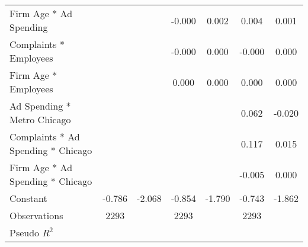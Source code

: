 {\begin{tabular}{l*{6}{c}}
Firm Age * Ad Spending&                  &                  &   -0.000         &    0.002\sym{***}&    0.004\sym{**} &    0.001         \\
Complaints * Employees&                  &                  &   -0.000         &    0.000         &   -0.000         &    0.000         \\
Firm Age * Employees&                  &                  &    0.000         &    0.000         &    0.000         &    0.000         \\
Ad Spending * Metro Chicago&                  &                  &                  &                  &    0.062\sym{*}  &   -0.020         \\
Complaints * Ad Spending * Chicago&                  &                  &                  &                  &    0.117         &    0.015\sym{**} \\
Firm Age * Ad Spending * Chicago&                  &                  &                  &                  &   -0.005\sym{***}&    0.000         \\
Constant        &   -0.786\sym{***}&   -2.068\sym{***}&   -0.854\sym{***}&   -1.790\sym{***}&   -0.743\sym{***}&   -1.862\sym{***}\\
\hline
Observations    &     2293         &                  &     2293         &                  &     2293         &                  \\
Pseudo \(R^{2}\)&                  &                  &                  &                  &                  &                  \\
\hline\hline
\end{tabular}
}
